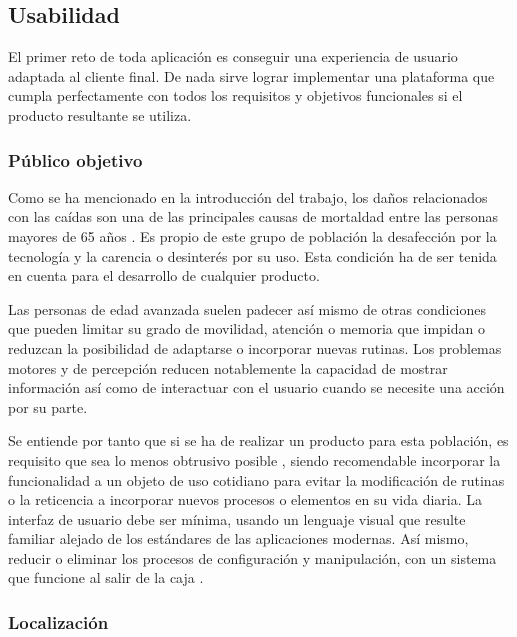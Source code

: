 \subsection{Usabilidad}
El primer reto de toda aplicación es conseguir una experiencia de usuario adaptada al cliente final. De nada sirve lograr implementar una plataforma que cumpla perfectamente con todos los requisitos y objetivos funcionales si el producto resultante se utiliza.

\subsubsection{Público objetivo}
Como se ha mencionado en la introducción del trabajo, los daños relacionados con las caídas son una de las principales causas de mortaldad entre las personas mayores de 65 años . Es propio de este grupo de población la desafección por la tecnología y la carencia o desinterés por su uso. Esta condición ha de ser tenida en cuenta para el desarrollo de cualquier producto.

Las personas de edad avanzada suelen padecer así mismo de otras condiciones que pueden limitar su grado de movilidad, atención o memoria que impidan o reduzcan la posibilidad de adaptarse o incorporar nuevas rutinas. Los problemas motores y de percepción reducen notablemente la capacidad de mostrar información así como de interactuar con el usuario cuando se necesite una acción por su parte.

Se entiende por tanto que si se ha de realizar un producto para esta población, es requisito que sea lo menos obtrusivo posible , siendo recomendable incorporar la funcionalidad a un objeto de uso cotidiano para evitar la modificación de rutinas o la reticencia a incorporar nuevos procesos o elementos en su vida diaria. La interfaz de usuario debe ser mínima, usando un lenguaje visual que resulte familiar alejado de los estándares de las aplicaciones modernas. Así mismo, reducir o eliminar los procesos de configuración y manipulación, con un sistema que funcione al salir de la caja .

\subsubsection{Localización}


